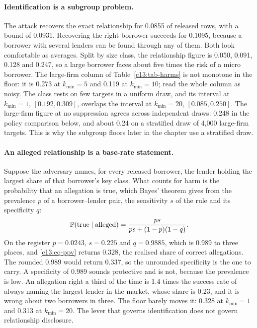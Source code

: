 \paragraph{Identification is a subgroup problem.} The attack recovers the exact
relationship for 0.0855 of released rows, with a bound of 0.0931. Recovering the right
borrower succeeds for 0.1095, because a borrower with several lenders can be found
through any of them.
Both look comfortable as averages. Split by size class, the relationship figure is
0.050, 0.091, 0.128 and 0.247, so a large borrower faces about five times the risk
of a micro borrower.
The large-firm column of Table~\ref{c13:tab-harms} is not monotone in the floor: it
is 0.273 at $k_{\min}=5$ and 0.119 at $k_{\min}=10$; read the whole column as noisy. The class rests on few targets
in a uniform draw, and its interval at $k_{\min}=1$, $[0.192, 0.309]$, overlaps the
interval at $k_{\min}=20$, $[0.085, 0.250]$.
The large-firm figure at no suppression agrees across independent draws: 0.248 in
the policy comparison below, and about 0.24 on a stratified draw of 4{,}000
large-firm targets. This is why the subgroup floors later in the chapter use a
stratified draw.

\paragraph{An alleged relationship is a base-rate statement.} Suppose the adversary
names, for every released borrower, the lender holding the largest share of that
borrower's key class. What counts for harm is the probability that an allegation is
true, which Bayes' theorem gives from the prevalence $p$ of a borrower--lender pair,
the sensitivity $s$ of the rule and its specificity $q$:
\begin{equation}\label{c13:eq-ppv}
\mathbb{P}(\text{true} \mid \text{alleged}) = \frac{ps}{ps + (1-p)(1-q)} .
\end{equation}
On the register $p = 0.0243$, $s = 0.225$ and $q = 0.9885$, which is 0.989 to three
places, and \eqref{c13:eq-ppv} returns 0.328, the realised share of correct allegations.
The rounded 0.989 would return 0.337, so the unrounded specificity is the one to carry.
A specificity of 0.989 sounds protective and is not, because the prevalence is low.
An allegation right a third of the time is 1.4 times the success rate of always
naming the largest lender in the market, whose share is 0.23, and it is wrong about
two borrowers in three. The floor barely moves it: 0.328 at $k_{\min}=1$ and 0.313
at $k_{\min}=20$.
The lever that governs identification does not govern relationship disclosure.

